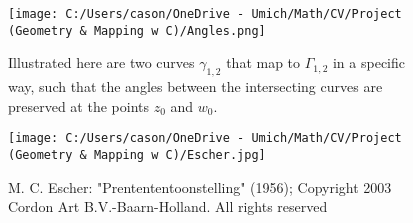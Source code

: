 \documentclass[a4paper,man,natbib]{apa6}
\begin{document}
\begin{figure}

      \centering
      \texttt{[image: C:/Users/cason/OneDrive - Umich/Math/CV/Project (Geometry \& Mapping w C)/Angles.png]}
      \caption{\label{C:/Users/cason/OneDrive - Umich/Math/CV/Project (Geometry & Mapping w C)/Angles.png}
      Illustrated here are two curves $ \gamma_{1,2} $ that map to $ \Gamma_{1,2} $ in a specific way, 
      such that the angles between the intersecting curves are preserved at the points $ z_0 $ and $ w_0 $.}

\end{figure}

\begin{figure}

      \centering
      \texttt{[image: C:/Users/cason/OneDrive - Umich/Math/CV/Project (Geometry \& Mapping w C)/Escher.jpg]}
      \caption{\label{C:/Users/cason/OneDrive - Umich/Math/CV/Project (Geometry & Mapping w C)/Escher.jpg}
      M. C. Escher: "Prentententoonstelling" (1956); Copyright 2003 Cordon Art B.V.-Baarn-Holland. All rights reserved}

\end{figure}
\end{document}
